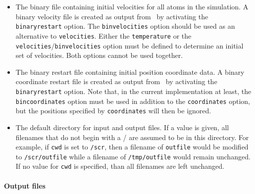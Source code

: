 \begin{itemize}
\item
{}
{\label{param:binvelocities}
The binary file containing initial velocities for all 
atoms in the simulation.  
A binary velocity file is created as output from \NAMD\ 
by activating the \verb!binaryrestart! option.  
The \verb!binvelocities! option should be used as 
an alternative to \verb!velocities!.  
Either the \verb!temperature! 
or the \verb!velocities!/\verb!binvelocities! 
option must be defined to determine an initial set of velocities.  
Both options cannot be used together.  
}

\item
{}
{
The binary restart file containing initial position 
coordinate data.  
A binary coordinate restart file is created as output from \NAMD\ 
by activating the \verb!binaryrestart! option.  
Note that, in the current implementation at least, 
the \verb!bincoordinates! option must be used in addition 
to the \verb!coordinates! option, 
but the positions specified by \verb!coordinates! will then be ignored.  
}

\item
{}
{The default directory for input and output files.  
If a value is given, all filenames that 
do not begin with a / are assumed to be in this directory.  
For example, if \verb!cwd! is set to \verb!/scr!, then a
filename of \verb!outfile! would be modified to \verb!/scr/outfile!
while a filename of \verb!/tmp/outfile! would remain unchanged.
If no value for \verb!cwd! is specified, than all filenames are 
left unchanged.}

\end{itemize}

\paragraph{Output files}

